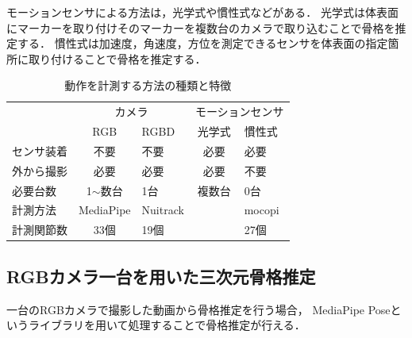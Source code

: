 \documentclass[titlepage]{jarticle}
\begin{document}
モーションセンサによる方法は，光学式や慣性式などがある．
光学式は体表面にマーカーを取り付けそのマーカーを複数台のカメラで取り込むことで骨格を推定する．
慣性式は加速度，角速度，方位を測定できるセンサを体表面の指定箇所に取り付けることで骨格を推定する．


\begin{table}[t!]
  \centering
  \caption{動作を計測する方法の種類と特徴}
  \begin{tabular}{l|ll|ll}
    \hline
                  & \multicolumn{2}{c|}{\small{カメラ}}       & \multicolumn{2}{c}{\small{モーションセンサ}}                                                     \\ \cline{2-5}
                  & \multicolumn{1}{c|}{\small{RGB}}       & \small{RGBD}                         & \multicolumn{1}{c|}{\small{光学式}} & \small{慣性式}    \\ \hline
    \small{センサ装着} & \multicolumn{1}{c|}{\small{不要}}        & \small{不要}                           & \multicolumn{1}{c|}{\small{必要}}  & \small{必要}     \\
    \small{外から撮影} & \multicolumn{1}{c|}{\small{必要}}        & \small{必要}                           & \multicolumn{1}{c|}{\small{必要}}  & \small{不要}     \\
    \small{必要台数}  & \multicolumn{1}{c|}{\small{1$\sim$数台}} & \small{1台}                           & \multicolumn{1}{c|}{\small{複数台}} & \small{0台}     \\ \hline
    \small{計測方法}  & \multicolumn{1}{c|}{\small{MediaPipe}} & \small{Nuitrack}                     & \multicolumn{1}{c|}{\small{}}    & \small{mocopi} \\%
    \small{計測関節数} & \multicolumn{1}{c|}{\small{33個}}       & \small{19個}                          & \multicolumn{1}{c|}{\small{}}    & \small{27個}    \\
    \hline
  \end{tabular}
  \label{3D_1}
\end{table}
%
%
\subsection{RGBカメラ一台を用いた三次元骨格推定}
%
一台のRGBカメラで撮影した動画から骨格推定を行う場合，
MediaPipe Pose\cite{mediapipe}というライブラリを用いて処理することで骨格推定が行える．
\end{document}
